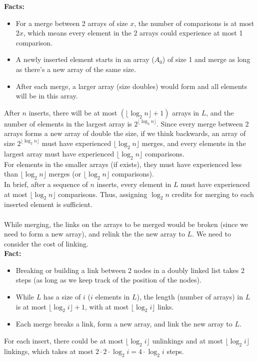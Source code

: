 \documentclass[10pt]{article}
\begin{document}
\begin{itemize}
\textbf{Facts:}
\begin{itemize}
\item For a merge between 2 arrays of size $x$, the number of comparisons is at most $2x$, which means every element in the 2 arrays could experience at most 1 comparison.
\item A newly inserted element starts in an array ($A_0$) of size 1 and merge as long as there's a new array of the same size.
\item After each merge, a larger array (size doubles) would form and all elements will be in this array.
\end{itemize}
After $n$ inserts, there will be at most $(\lfloor\log_2n\rfloor + 1)$ arrays in $L$, and the number of elements in the largest array is $2^{\lfloor\log_2n\rfloor}$. Since every merge between 2 arrays forms a new array of double the size, if we think backwards, an array of size $2^{\lfloor\log_2n\rfloor}$ must have experienced $\lfloor\log_2n\rfloor$ merges, and every elements in the largest array must have experienced $\lfloor\log_2n\rfloor$ comparisons.\\
For elements in the smaller arrays (if exists), they must have experienced less than $\lfloor\log_2n\rfloor$ merges (or $\lfloor\log_2n\rfloor$ comparisons).\\
In brief, after a sequence of $n$ inserts, every element in $L$ must have experienced at most $\lfloor\log_2n\rfloor$ comparisons. Thus, assigning $\log_2n$ credits for merging to each inserted element is sufficient.\\
\\
While merging, the links on the arrays to be merged would be broken (since we need to form a new array), and relink the the new array to $L$. We need to consider the cost of linking.\\
\textbf{Fact:} 
\begin{itemize}
\item Breaking or building a link between 2 nodes in a doubly linked list takes 2 steps (as long as we keep track of the position of the nodes).
\item While $L$ has a size of $i$ ($i$ elements in $L$), the length (number of arrays) in $L$ is at most $\lfloor\log_2i\rfloor + 1$, with at most $\lfloor\log_2i\rfloor$ links.
\item Each merge breaks a link, form a new array, and link the new array to $L$.
\end{itemize}
For each insert, there could be at most $\lfloor\log_2i\rfloor$ unlinkings and at most $\lfloor\log_2i\rfloor$ linkings, which takes at most $2\cdot2\cdot\log_2i = 4\cdot\log_2i$ steps.\\

\end{itemize}
\end{document}
